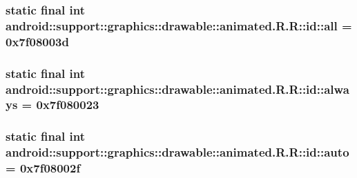 \hypertarget{classandroid_1_1support_1_1graphics_1_1drawable_1_1animated_1_1_r_1_1id_8af33bb70075d45cad5c724aa78a1f68}{
\subsubsection[{all}]{\setlength{\rightskip}{0pt plus 5cm}static final int android::support::graphics::drawable::animated.R.R::id::all = 0x7f08003d}}
\label{classandroid_1_1support_1_1graphics_1_1drawable_1_1animated_1_1_r_1_1id_8af33bb70075d45cad5c724aa78a1f68}


\hypertarget{classandroid_1_1support_1_1graphics_1_1drawable_1_1animated_1_1_r_1_1id_b800a7140f41e98f380bd20596fbf13c}{
\subsubsection[{always}]{\setlength{\rightskip}{0pt plus 5cm}static final int android::support::graphics::drawable::animated.R.R::id::always = 0x7f080023}}
\label{classandroid_1_1support_1_1graphics_1_1drawable_1_1animated_1_1_r_1_1id_b800a7140f41e98f380bd20596fbf13c}


\hypertarget{classandroid_1_1support_1_1graphics_1_1drawable_1_1animated_1_1_r_1_1id_8abaf657e173c4ac7d373a2763b46150}{
\subsubsection[{auto}]{\setlength{\rightskip}{0pt plus 5cm}static final int android::support::graphics::drawable::animated.R.R::id::auto = 0x7f08002f}}
\label{classandroid_1_1support_1_1graphics_1_1drawable_1_1animated_1_1_r_1_1id_8abaf657e173c4ac7d373a2763b46150}


